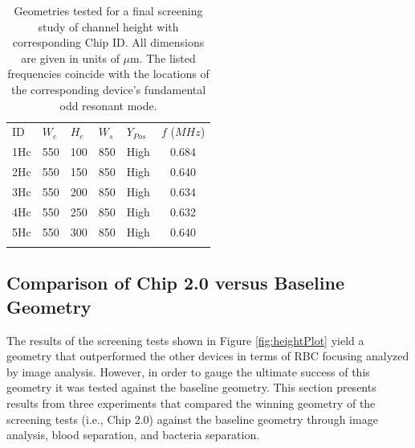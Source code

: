 \begin{table}[h]
\caption[Geometries tested for a final screening study of channel height]{Geometries tested for a final screening study of channel height with corresponding Chip ID. All dimensions are given in units of $\mu$m. The listed frequencies coincide with the locations of the corresponding device's fundamental odd resonant mode.}
\label{tab:height}       %
\centering
\begin{tabular}{lllll | c}
\hline\noalign{\smallskip}
ID & $W_c$ & $H_c$ & $W_s$ & $Y_{Pos}$ & $f$ ($MHz$)\\
\noalign{\smallskip}\hline\noalign{\smallskip}
1Hc & 550 & 100 & 850 & High & 0.684 \\
2Hc & 550 & 150 & 850 & High & 0.640 \\
3Hc & 550 & 200 & 850 & High & 0.634 \\
4Hc & 550 & 250 & 850 & High & 0.632 \\
5Hc & 550 & 300 & 850 & High & 0.640 \\
\noalign{\smallskip}\hline
\end{tabular}
\end{table}

\subsection{Comparison of Chip 2.0 versus Baseline Geometry}
\label{ssec:comparison}

The results of the screening tests shown in Figure \ref{fig:heightPlot} yield a geometry that outperformed the other devices in terms of RBC focusing analyzed by image analysis. However, in order to gauge the ultimate success of this geometry it was tested against the baseline geometry. This section presents results from three experiments that compared the winning geometry of the screening tests (i.e., Chip 2.0) against the baseline geometry through image analysis, blood separation, and bacteria separation.


